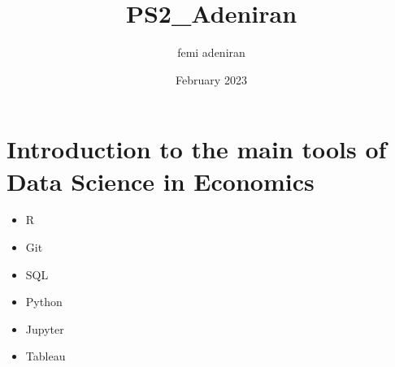 \documentclass{article}
\title{PS2_Adeniran}
\author{femi adeniran}
\date{February 2023}
\begin{document}
\maketitle

\section{Introduction to the main tools of Data Science in Economics}
\begin{itemize}
    \item {R} 
    \item {Git} 
    \item {SQL} 
    \item {Python} 
    \item {Jupyter} 
    \item {Tableau}
    
\end{itemize}
\end{document}
